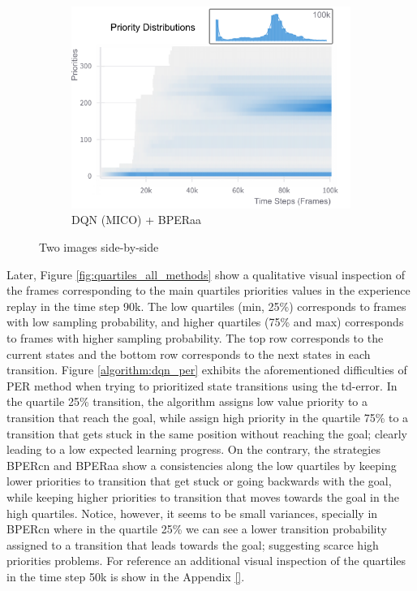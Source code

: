 \begin{figure}[h]
\begin{subfigure}{0.32\textwidth}
        \includegraphics[width=\linewidth]{Results/grid_world/priority_distribution_dqn_mico_bperaa.png}
        \caption{DQN (MICO) + BPERaa}
        \label{fig:priority_distribution_bperaa}
    \end{subfigure}
    \caption{Two images side-by-side}
    \label{fig:priority_distributions}
\end{figure}


Later, Figure \ref{fig:quartiles_all_methods} show a qualitative visual inspection of the frames corresponding to the main quartiles priorities values in the experience replay in the time step 90k. The low quartiles (min, 25\%) corresponds to frames with low sampling probability, and higher quartiles (75\% and max) corresponds to frames with higher sampling probability. The top row corresponds to the current states and the bottom row corresponds to the next states in each transition. Figure \ref{algorithm:dqn_per} exhibits the aforementioned difficulties of PER method when trying to prioritized state transitions using the td-error. In the quartile 25\% transition, the algorithm assigns low value priority to a transition that reach the goal, while assign high priority in the quartile 75\% to a transition that gets stuck in the same position without reaching the goal; clearly leading to a low expected learning progress. On the contrary, the strategies BPERcn and BPERaa show a consistencies along the low quartiles by keeping lower priorities to transition that get stuck or going backwards with the goal, while keeping higher priorities to transition that moves towards the goal in the high quartiles. Notice, however, it seems to be small variances, specially in BPERcn where in the quartile 25\% we can see a lower transition probability assigned to a transition that leads towards the goal; suggesting scarce high priorities problems. For reference an additional visual inspection of the quartiles in the time step 50k is show in the Appendix \ref{}. 

